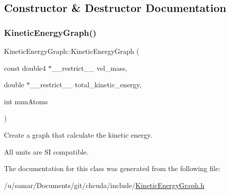\subsection{Constructor \& Destructor Documentation}
\hypertarget{classKineticEnergyGraph_a5dea5ca46df5e90b2b9ceb5624876113}{}\label{classKineticEnergyGraph_a5dea5ca46df5e90b2b9ceb5624876113} 
\subsubsection{\texorpdfstring{Kinetic\+Energy\+Graph()}{KineticEnergyGraph()}}
{\footnotesize\ttfamily Kinetic\+Energy\+Graph\+::\+Kinetic\+Energy\+Graph (\begin{DoxyParamCaption}\item[{const double4 $\ast$\+\_\+\+\_\+restrict\+\_\+\+\_\+}]{vel\+\_\+mass,  }\item[{double $\ast$\+\_\+\+\_\+restrict\+\_\+\+\_\+}]{total\+\_\+kinetic\+\_\+energy,  }\item[{int}]{num\+Atoms }\end{DoxyParamCaption})}



Create a graph that calculate the kinetic energy. 

All units are SI compatible. 

The documentation for this class was generated from the following file\+:\begin{DoxyCompactItemize}
\item 
/u/samar/\+Documents/git/chcuda/include/\hyperlink{KineticEnergyGraph_8h}{Kinetic\+Energy\+Graph.\+h}\end{DoxyCompactItemize}
